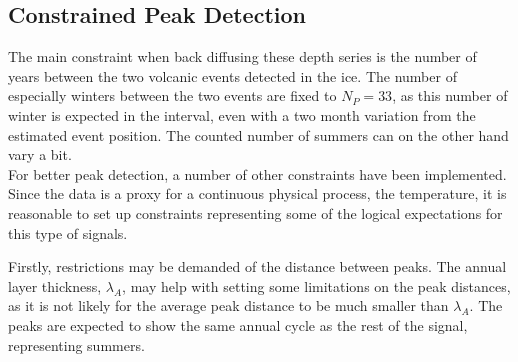 \documentclass[../../CompleteThesis2/Complete_2ndDraft]{subfiles}
\begin{document}
%		
%		
%		

\subsection[Constrained Peak Detection]{Constrained Peak Detection}
\label{Subsec:Meth_PeakDetection_Constrained}
The main constraint when back diffusing these depth series is the number of years between the two volcanic events detected in the ice. The number of especially winters between the two events are fixed to $N_P=33$, as this number of winter is expected in the interval, even with a two month variation from the estimated event position. The counted number of summers can on the other hand vary a bit.\\
For better peak detection, a number of other constraints have been implemented. Since the data is a proxy for a continuous physical process, the temperature, it is reasonable to set up constraints representing some of the logical expectations for this type of signals. 

Firstly, restrictions may be demanded of the distance between peaks. The annual layer thickness, $\lambda_A$, may help with setting some limitations on the peak distances, as it is not likely for the average peak distance to be much smaller than $\lambda_A$. The peaks are expected to show the same annual cycle as the rest of the signal, representing summers. 
\end{document}
